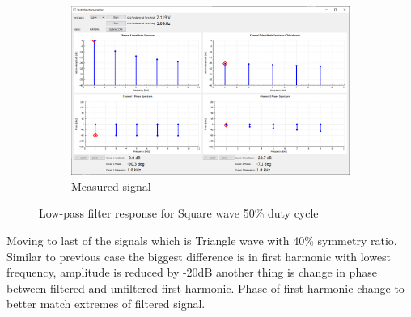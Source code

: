 \documentclass[notitlepage, a4paper, 11pt]{article}
\begin{document}
\begin{figure}[H]
\begin{subfigure}[][][t]{0.45\textwidth}
			\includegraphics[width=\textwidth, trim=10 80 10 100, clip]{../img/Circuit2/dut50}
			\caption{Measured signal}
		\end{subfigure}
		\caption{Low-pass filter response for Square wave 50\% duty cycle}
	\end{figure}
	
	Moving to last of the signals which is Triangle wave with 40\% symmetry ratio. Similar to previous case the biggest difference is in first harmonic with lowest frequency, amplitude is reduced by -20dB another thing is change in phase between filtered and unfiltered first harmonic. Phase of first harmonic change to better match extremes of filtered signal.
	
\end{document}
